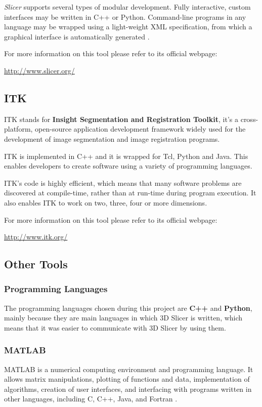 \textit{Slicer} supports several types of modular development. Fully
interactive, custom interfaces may be written in C++ or
Python. Command-line programs in any language may be wrapped using a
light-weight XML specification, from which a graphical interface is
automatically generated \cite{slicer}.

For more information on this tool please refer to its official webpage: 

\url{http://www.slicer.org/}

\subsection{ITK}
ITK stands for \textbf{Insight Segmentation and Registration Toolkit}, it's a cross-platform, open-source application development framework widely used for the development of image segmentation and image registration programs.

ITK  is implemented in C++ and it is wrapped for Tcl, Python and Java. This enables developers to create software using a variety of programming languages.

ITK's code is highly efficient, which means that many software problems are discovered at compile-time, rather than at run-time during program execution. It also enables ITK to work on two, three, four or more dimensions.

For more information on this tool please refer to its official webpage: 

\url{http://www.itk.org/}

\subsection{Other Tools}
\subsubsection{Programming Languages}
The programming languages chosen during this project are \textbf{C++} and \textbf{Python}, mainly because they are main languages in which 3D Slicer is written, which means that it was easier to communicate with 3D Slicer by using them.

\subsubsection{MATLAB}
MATLAB is a numerical computing environment and programming language. It allows matrix manipulations, plotting of functions and data, implementation of algorithms, creation of user interfaces, and interfacing with programs written in other languages, including C, C++, Java, and Fortran \cite{matlab}.

